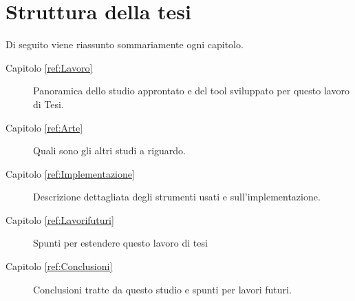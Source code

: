 
\section{Struttura della tesi}

Di seguito viene riassunto sommariamente ogni capitolo.

\begin{description}
	\item[Capitolo \ref{ref:Lavoro}] Panoramica dello studio approntato e del tool sviluppato per questo lavoro di Tesi.

	\item[Capitolo \ref{ref:Arte}] Quali sono gli altri studi a riguardo.

	\item[Capitolo \ref{ref:Implementazione}] Descrizione dettagliata degli strumenti usati e sull'implementazione.
	
	\item[Capitolo \ref{ref:Lavorifuturi}] Spunti per estendere questo lavoro di tesi

	\item[Capitolo \ref{ref:Conclusioni}] Conclusioni tratte da questo studio e spunti per lavori futuri.

\end{description}